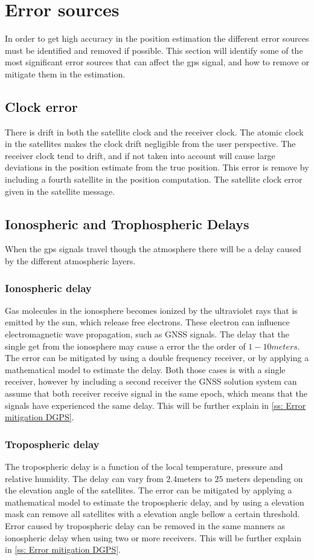  
\section{Error sources}
In order to get high accuracy in the position estimation the different error sources must be identified and removed if possible. This section will identify some of the most significant error sources that can affect the \gls{gps} signal, and how to remove or mitigate them in the estimation.
\subsection{Clock error}
There is drift in both the satellite clock and the receiver clock. The atomic clock in the satellites makes the clock drift negligible from the user perspective. The receiver clock tend to drift, and if not taken into account will cause large deviations in the position estimate from the true position. This error is remove by including a fourth satellite in the position computation. The satellite clock error given in the satellite message. 

\subsection{Ionospheric and Trophospheric Delays}
When the \gls{gps} signals travel though the atmosphere there will be a delay caused by the different atmospheric layers.
\subsubsection{Ionospheric delay}
Gas molecules in the ionosphere becomes ionized by the ultraviolet rays that is emitted by the sun, which release free electrons. These electron can influence electromagnetic wave propagation, such as GNSS signals. The delay that the single get from the ionosphere may cause a error the the order of $1-10 meters$. The error can be mitigated by using a double frequency receiver, or by applying a mathematical model to estimate the delay. Both those cases is with a single receiver, however by including a second receiver the GNSS solution system can assume that both receiver receive signal in the same epoch, which means that the signals have experienced the same delay. This will be further explain in \ref{ss: Error mitigation DGPS}.

\subsubsection{Tropospheric delay}
The tropospheric delay is a function of the local temperature, pressure and relative humidity. The delay can vary from $2.4$meters to $25$ meters depending on the elevation angle of the satellites. The error can be mitigated by applying a mathematical model to estimate the tropospheric delay, and by using a elevation mask can remove all satellites with a elevation angle bellow a certain threshold. Error caused by tropospheric delay can be removed in the same manners as ionospheric delay when using two or more receivers. This will be further explain in \ref{ss: Error mitigation DGPS}.

